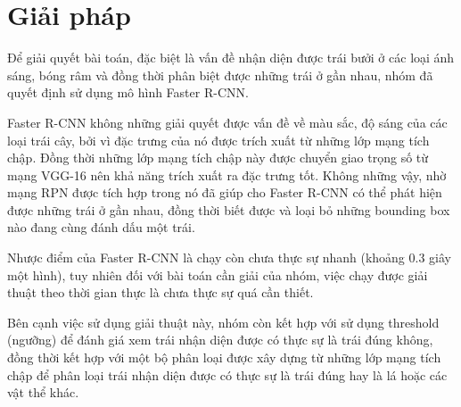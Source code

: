 \section{Giải pháp}
Để giải quyết bài toán, đặc biệt là vấn đề nhận diện được trái bưởi ở các loại ánh sáng, bóng râm và đồng thời phân biệt được những trái ở gần nhau, nhóm đã quyết định sử dụng mô hình Faster R-CNN.

Faster R-CNN không những giải quyết được vấn đề về màu sắc, độ sáng của các loại trái cây, bởi vì đặc trưng của nó được trích xuất từ những lớp mạng tích chập. Đồng thời những lớp mạng tích chập này được chuyển giao trọng số từ mạng VGG-16 nên khả năng trích xuất ra đặc trưng tốt. Không những vậy, nhờ mạng RPN được tích hợp trong nó đã giúp cho Faster R-CNN có thể phát hiện được những trái ở gần nhau, đồng thời biết được và loại bỏ những bounding box nào đang cùng đánh dấu một trái.

Nhược điểm của Faster R-CNN là chạy còn chưa thực sự nhanh (khoảng 0.3 giây một hình), tuy nhiên đối với bài toán cần giải của nhóm, việc chạy được giải thuật theo thời gian thực là chưa thực sự quá cần thiết.

Bên cạnh việc sử dụng giải thuật này, nhóm còn kết hợp với sử dụng threshold (ngưỡng) để đánh giá xem trái nhận diện được có thực sự là trái đúng không, đồng thời kết hợp với một bộ phân loại được xây dựng từ những lớp mạng tích chập để phân loại trái nhận diện được có thực sự là trái đúng hay là lá hoặc các vật thể khác.